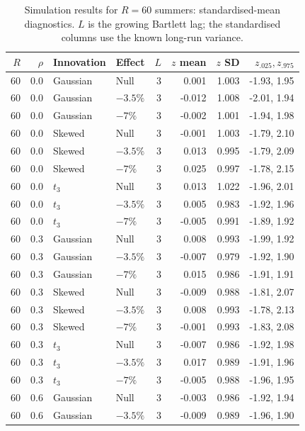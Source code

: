 \begin{table}[H]
\centering
\normalsize\renewcommand{\arraystretch}{1.55}\setlength{\tabcolsep}{4pt}
\caption{Simulation results for $R=60$ summers: standardised-mean diagnostics. $L$ is the growing Bartlett lag; the standardised columns use the known long-run variance.}
\label{tab:year-simulation-complete-b-r60}
\begin{tabular*}{\textwidth}{@{\extracolsep{\fill}}rrllrrrr}
\toprule
$R$ & $\rho$ & Innovation & Effect & $L$ & $z$ mean & $z$ SD & $z_{.025},z_{.975}$ \\
\midrule
60 & 0.0 & Gaussian & Null & 3 & 0.001 & 1.003 & -1.93, 1.95 \\
60 & 0.0 & Gaussian & $-3.5\%$ & 3 & -0.012 & 1.008 & -2.01, 1.94 \\
60 & 0.0 & Gaussian & $-7\%$ & 3 & -0.002 & 1.001 & -1.94, 1.98 \\
60 & 0.0 & Skewed & Null & 3 & -0.001 & 1.003 & -1.79, 2.10 \\
60 & 0.0 & Skewed & $-3.5\%$ & 3 & 0.013 & 0.995 & -1.79, 2.09 \\
60 & 0.0 & Skewed & $-7\%$ & 3 & 0.025 & 0.997 & -1.78, 2.15 \\
60 & 0.0 & $t_3$ & Null & 3 & 0.013 & 1.022 & -1.96, 2.01 \\
60 & 0.0 & $t_3$ & $-3.5\%$ & 3 & 0.005 & 0.983 & -1.92, 1.96 \\
60 & 0.0 & $t_3$ & $-7\%$ & 3 & -0.005 & 0.991 & -1.89, 1.92 \\
60 & 0.3 & Gaussian & Null & 3 & 0.008 & 0.993 & -1.99, 1.92 \\
60 & 0.3 & Gaussian & $-3.5\%$ & 3 & -0.007 & 0.979 & -1.92, 1.90 \\
60 & 0.3 & Gaussian & $-7\%$ & 3 & 0.015 & 0.986 & -1.91, 1.91 \\
60 & 0.3 & Skewed & Null & 3 & -0.009 & 0.988 & -1.81, 2.07 \\
60 & 0.3 & Skewed & $-3.5\%$ & 3 & 0.008 & 0.993 & -1.78, 2.13 \\
60 & 0.3 & Skewed & $-7\%$ & 3 & -0.001 & 0.993 & -1.83, 2.08 \\
60 & 0.3 & $t_3$ & Null & 3 & -0.007 & 0.986 & -1.92, 1.98 \\
60 & 0.3 & $t_3$ & $-3.5\%$ & 3 & 0.017 & 0.989 & -1.91, 1.96 \\
60 & 0.3 & $t_3$ & $-7\%$ & 3 & -0.005 & 0.988 & -1.96, 1.95 \\
60 & 0.6 & Gaussian & Null & 3 & -0.003 & 0.986 & -1.92, 1.94 \\
60 & 0.6 & Gaussian & $-3.5\%$ & 3 & -0.009 & 0.989 & -1.96, 1.90 \\

\end{tabular*}
\end{table}
